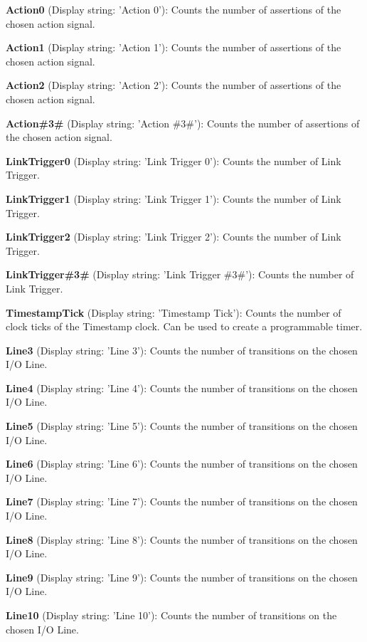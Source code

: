 \begin{DoxyItemize}
\item {\bfseries Action0} (Display string\+: 'Action 0')\+: Counts the number of assertions of the chosen action signal.
\item {\bfseries Action1} (Display string\+: 'Action 1')\+: Counts the number of assertions of the chosen action signal.
\item {\bfseries Action2} (Display string\+: 'Action 2')\+: Counts the number of assertions of the chosen action signal.
\item {\bfseries Action\#3\#} (Display string\+: 'Action \#3\#')\+: Counts the number of assertions of the chosen action signal.
\item {\bfseries Link\+Trigger0} (Display string\+: 'Link Trigger 0')\+: Counts the number of Link Trigger.
\item {\bfseries Link\+Trigger1} (Display string\+: 'Link Trigger 1')\+: Counts the number of Link Trigger.
\item {\bfseries Link\+Trigger2} (Display string\+: 'Link Trigger 2')\+: Counts the number of Link Trigger.
\item {\bfseries Link\+Trigger\#3\#} (Display string\+: 'Link Trigger \#3\#')\+: Counts the number of Link Trigger.
\item {\bfseries Timestamp\+Tick} (Display string\+: 'Timestamp Tick')\+: Counts the number of clock ticks of the Timestamp clock. Can be used to create a programmable timer.
\item {\bfseries Line3} (Display string\+: 'Line 3')\+: Counts the number of transitions on the chosen I/\+O Line.
\item {\bfseries Line4} (Display string\+: 'Line 4')\+: Counts the number of transitions on the chosen I/\+O Line.
\item {\bfseries Line5} (Display string\+: 'Line 5')\+: Counts the number of transitions on the chosen I/\+O Line.
\item {\bfseries Line6} (Display string\+: 'Line 6')\+: Counts the number of transitions on the chosen I/\+O Line.
\item {\bfseries Line7} (Display string\+: 'Line 7')\+: Counts the number of transitions on the chosen I/\+O Line.
\item {\bfseries Line8} (Display string\+: 'Line 8')\+: Counts the number of transitions on the chosen I/\+O Line.
\item {\bfseries Line9} (Display string\+: 'Line 9')\+: Counts the number of transitions on the chosen I/\+O Line.
\item {\bfseries Line10} (Display string\+: 'Line 10')\+: Counts the number of transitions on the chosen I/\+O Line.

\end{DoxyItemize}
